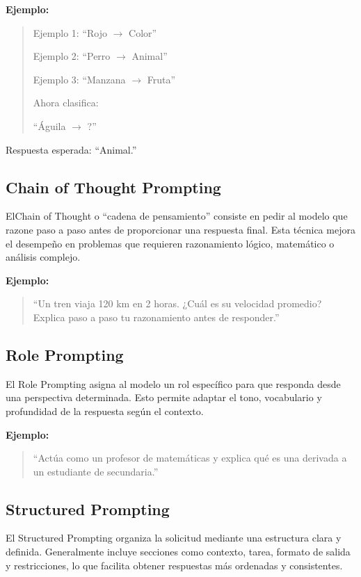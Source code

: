 \documentclass[12pt,a4paper]{article}
\begin{document}
\textbf{Ejemplo:}

\begin{quote}
Ejemplo 1: ``Rojo $\rightarrow$ Color''

Ejemplo 2: ``Perro $\rightarrow$ Animal''

Ejemplo 3: ``Manzana $\rightarrow$ Fruta''

Ahora clasifica:

``Águila $\rightarrow$ ?''
\end{quote}

Respuesta esperada: ``Animal.''

\subsection{ Chain of Thought Prompting}

ElChain of Thought o ``cadena de pensamiento'' consiste en pedir al modelo que razone paso a paso antes de proporcionar una respuesta final. Esta técnica mejora el desempeño en problemas que requieren razonamiento lógico, matemático o análisis complejo.

\textbf{Ejemplo:}

\begin{quote}
``Un tren viaja 120 km en 2 horas. ¿Cuál es su velocidad promedio? Explica paso a paso tu razonamiento antes de responder.''
\end{quote}

\subsection{Role Prompting}

El Role Prompting asigna al modelo un rol específico para que responda desde una perspectiva determinada. Esto permite adaptar el tono, vocabulario y profundidad de la respuesta según el contexto.

\textbf{Ejemplo:}

\begin{quote}
``Actúa como un profesor de matemáticas y explica qué es una derivada a un estudiante de secundaria.''
\end{quote}

\subsection{Structured Prompting}

El Structured Prompting organiza la solicitud mediante una estructura clara y definida. Generalmente incluye secciones como contexto, tarea, formato de salida y restricciones, lo que facilita obtener respuestas más ordenadas y consistentes.
\end{document}
